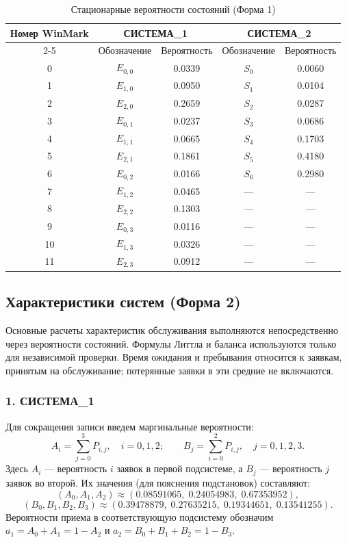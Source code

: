 \documentclass[a4paper,12pt]{article}
\begin{document}
    \begin{table}[H]
        \centering
        \caption{Стационарные вероятности состояний (Форма 1)}
        \begin{tabular}{|c|c|c|c|c|}
            \hline
            \textbf{Номер WinMark} & \multicolumn{2}{c|}{\textbf{СИСТЕМА\_1}} & \multicolumn{2}{c|}{\textbf{СИСТЕМА\_2}} \\ \cline{2-5}
            & Обозначение & Вероятность & Обозначение & Вероятность \\ \hline
            0 & $E_{0,0}$ & 0.0339 & $S_0$ & 0.0060 \\ \hline
            1 & $E_{1,0}$ & 0.0950 & $S_1$ & 0.0104 \\ \hline
            2 & $E_{2,0}$ & 0.2659 & $S_2$ & 0.0287 \\ \hline
            3 & $E_{0,1}$ & 0.0237 & $S_3$ & 0.0686 \\ \hline
            4 & $E_{1,1}$ & 0.0665 & $S_4$ & 0.1703 \\ \hline
            5 & $E_{2,1}$ & 0.1861 & $S_5$ & 0.4180 \\ \hline
            6 & $E_{0,2}$ & 0.0166 & $S_6$ & 0.2980 \\ \hline
            7 & $E_{1,2}$ & 0.0465 & --- & --- \\ \hline
            8 & $E_{2,2}$ & 0.1303 & --- & --- \\ \hline
            9 & $E_{0,3}$ & 0.0116 & --- & --- \\ \hline
            10 & $E_{1,3}$ & 0.0326 & --- & --- \\ \hline
            11 & $E_{2,3}$ & 0.0912 & --- & --- \\ \hline
        \end{tabular}
    \end{table}

    \subsection{Характеристики систем (Форма 2)}

    Основные расчеты характеристик обслуживания выполняются непосредственно
    через вероятности состояний. Формулы Литтла и баланса используются только
    для независимой проверки. Время ожидания и пребывания относится к заявкам,
    принятым на обслуживание; потерянные заявки в эти средние не включаются.

    \subsubsection*{1. СИСТЕМА\_1}
    Для сокращения записи введем маргинальные вероятности:
    \[
        A_i=\sum_{j=0}^{3}P_{i,j},\quad i=0,1,2;
        \qquad B_j=\sum_{i=0}^{2}P_{i,j},\quad j=0,1,2,3.
    \]
    Здесь $A_i$ --- вероятность $i$ заявок в первой подсистеме, а $B_j$ ---
    вероятность $j$ заявок во второй. Их значения (для пояснения подстановок)
    составляют:
    \[
        (A_0,A_1,A_2)\approx(0.08591065,\;0.24054983,\;0.67353952),
    \]
    \[
        (B_0,B_1,B_2,B_3)\approx
        (0.39478879,\;0.27635215,\;0.19344651,\;0.13541255).
    \]
    Вероятности приема в соответствующую подсистему обозначим
    $a_1=A_0+A_1=1-A_2$ и $a_2=B_0+B_1+B_2=1-B_3$.
\end{document}
